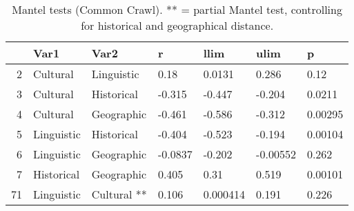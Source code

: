 \begin{table}[ht]
\centering
\begin{tabular}{rllllll}
  \hline
 & Var1 & Var2 & r & llim & ulim & p \\ 
  \hline
2 & Cultural & Linguistic & 0.18 & 0.0131 & 0.286 & 0.12 \\ 
  3 & Cultural & Historical & -0.315 & -0.447 & -0.204 & 0.0211 \\ 
  4 & Cultural & Geographic & -0.461 & -0.586 & -0.312 & 0.00295 \\ 
  5 & Linguistic & Historical & -0.404 & -0.523 & -0.194 & 0.00104 \\ 
  6 & Linguistic & Geographic & -0.0837 & -0.202 & -0.00552 & 0.262 \\ 
  7 & Historical & Geographic & 0.405 & 0.31 & 0.519 & 0.00101 \\ 
  71 & Linguistic & Cultural ** & 0.106 & 0.000414 & 0.191 & 0.226 \\ 
   \hline
\end{tabular}
\caption{Mantel tests (Common Crawl). ** = partial Mantel test, controlling for historical and geographical distance.} 
\end{table}

